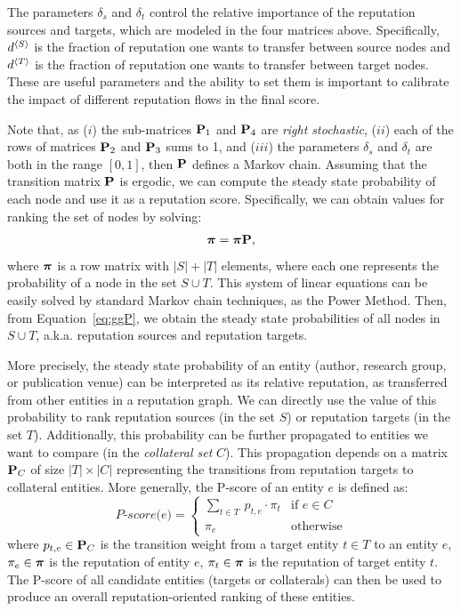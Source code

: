 \documentclass[msc]{ppgccufmg}
\begin{document}
The parameters $\delta_{s}$ and $\delta_{t}$ control the relative importance of the reputation sources and targets, which are modeled in the four matrices above. Specifically, $d{^{\langle S \rangle}}$ is the fraction of reputation one wants to transfer between source nodes and 
$d{^{\langle T \rangle}}$ is the fraction of reputation one wants to transfer between target nodes. These are useful parameters and the ability to set them is important to calibrate the impact of different reputation flows in the final score.

Note that, as ($i$) the sub-matrices ${\bf P}_1$ and ${\bf P}_4$ are \emph{right stochastic}, ($ii$) each of the rows of matrices ${\bf P}_2$ and ${\bf P}_3$ sums to 1, and ($iii$) the parameters $\delta_{s}$ and $\delta_{t}$ are both in the range $[0,1]$, then ${\bf P}$ defines a Markov chain. Assuming that the transition matrix ${\bf P}$ is ergodic, we can compute the steady state probability of each node and use it as a reputation score. Specifically, we can obtain values for ranking the set of nodes by solving:
\begin{align}
\label{eq:ggP}
	{\mbox{\boldmath $\pi$}} = {\mbox{\boldmath $\pi$}} {\bf P},
\end{align}
\noindent where ${\mbox{\boldmath $\pi$}}$ is a row matrix with $|S|+|T|$ elements, where each one represents the probability of a node in the set $S \cup T$. This system of linear equations can be easily solved by standard Markov chain techniques, as the Power Method. Then, from Equation~\eqref{eq:ggP}, we obtain the steady state probabilities of all nodes in $S \cup T$, a.k.a. reputation sources and reputation targets.

More precisely, the steady state probability of an entity (author, research group, or publication venue) can be interpreted as its relative reputation, as transferred from other entities in a reputation graph. We can directly use the value of this probability to rank reputation sources (in the set $S$) or reputation targets (in the set $T$). Additionally, this probability can be further propagated to entities we want to compare (in the \textit{collateral set} $C$). 
This propagation depends on a matrix ${\bf P}_C$ of size $|T|\times |C|$ representing the transitions from reputation targets to collateral entities. 
More generally, the P-score of an entity $e$ is defined as:
\begin{equation}\label{eq:pscore}
    \textit{P-score(e)} = \begin{cases}
        \displaystyle\sum\limits_{t \in T} \ p_{t,e} \cdot \pi_t & \text{if $e \in C$}\\
        \pi_e &\text{otherwise}
    \end{cases}
\end{equation}
where $p_{t,e} \in {\bf P}_C$ is the transition weight from a target entity $t \in T$ to an entity $e$, $\pi_e \in {\mbox{\boldmath $\pi$}}$ is the reputation of entity $e$, $\pi_t \in {\mbox{\boldmath $\pi$}}$ is the reputation of target entity $t$. The P-score of all candidate entities (targets or collaterals) can then be used to produce an overall reputation-oriented ranking of these entities.
\end{document}
